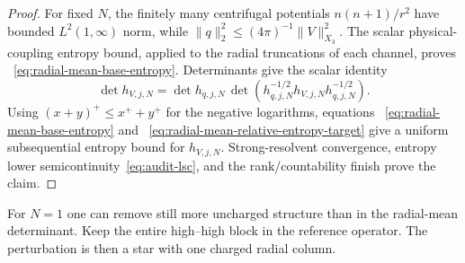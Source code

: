 \documentclass[11pt]{article}
\theoremstyle{definition}
\theoremstyle{remark}
\begin{document}
\begin{proof}
For fixed $N$, the finitely many centrifugal potentials $n(n+1)/r^2$ have
bounded $L^2(1,\infty)$ norm, while
$\|q\|_2^2\leq(4\pi)^{-1}\|V\|_{X_3}^2$.  The scalar physical-coupling entropy
bound, applied to the radial truncations of each channel, proves
~\eqref{eq:radial-mean-base-entropy}.  Determinants give the scalar identity
\begin{equation}
 \det h_{V,j,N}
 =\det h_{q,j,N}\,
  \det(h_{q,j,N}^{-1/2}h_{V,j,N}h_{q,j,N}^{-1/2}).
\end{equation}
Using $(x+y)^+\leq x^++y^+$ for the negative logarithms, equations
~\eqref{eq:radial-mean-base-entropy} and
~\eqref{eq:radial-mean-relative-entropy-target} give a uniform subsequential
entropy bound for $h_{V,j,N}$.  Strong-resolvent convergence, entropy lower
semicontinuity~\eqref{eq:audit-lsc}, and the rank/countability finish prove the
claim.
\end{proof}

For $N=1$ one can remove still more uncharged structure than in the
radial-mean determinant.  Keep the entire high--high block in the reference
operator.  The perturbation is then a star with one charged radial column.
\end{document}
